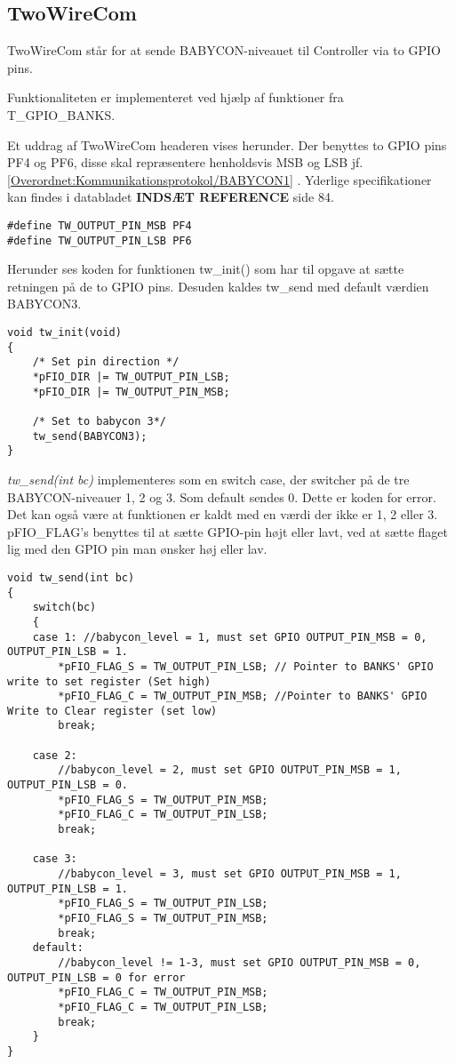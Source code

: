 \subsection{TwoWireCom}
TwoWireCom står for at sende BABYCON-niveauet til Controller via to GPIO pins. 

Funktionaliteten er implementeret ved hjælp af funktioner fra T\_GPIO\_BANKS. 

Et uddrag af TwoWireCom headeren vises herunder.
Der benyttes to GPIO pins PF4 og PF6, disse skal repræsentere henholdsvis MSB og LSB jf. \ref{Overordnet:Kommunikationsprotokol/BABYCON1} . Yderlige specifikationer kan findes i databladet \textbf{INDSÆT REFERENCE} side 84. 

\begin{verbatim}
#define TW_OUTPUT_PIN_MSB PF4
#define TW_OUTPUT_PIN_LSB PF6
\end{verbatim}

Herunder ses koden for funktionen tw\_init() som har til opgave at sætte retningen på de to GPIO pins. Desuden kaldes tw\_send med default værdien BABYCON3. 
\begin{verbatim}
void tw_init(void)
{
    /* Set pin direction */
    *pFIO_DIR |= TW_OUTPUT_PIN_LSB;
    *pFIO_DIR |= TW_OUTPUT_PIN_MSB;

    /* Set to babycon 3*/
    tw_send(BABYCON3);
}
\end{verbatim}

\textit{tw\_send(int bc)} implementeres som en switch case, der switcher på de tre BABYCON-niveauer 1, 2 og 3. Som default sendes 0. Dette er koden for error. Det kan også være at funktionen er kaldt med en værdi der ikke er 1, 2 eller 3.  
pFIO\_FLAG's benyttes til at sætte GPIO-pin højt eller lavt, ved at sætte flaget lig med den GPIO pin man ønsker høj eller lav. 

\begin{verbatim}
void tw_send(int bc)
{
    switch(bc)
    {
    case 1:	//babycon_level = 1, must set GPIO OUTPUT_PIN_MSB = 0, OUTPUT_PIN_LSB = 1.
        *pFIO_FLAG_S = TW_OUTPUT_PIN_LSB; // Pointer to BANKS' GPIO write to set register (Set high)
        *pFIO_FLAG_C = TW_OUTPUT_PIN_MSB; //Pointer to BANKS' GPIO Write to Clear register (set low)
        break;

    case 2:
        //babycon_level = 2, must set GPIO OUTPUT_PIN_MSB = 1, OUTPUT_PIN_LSB = 0.
        *pFIO_FLAG_S = TW_OUTPUT_PIN_MSB;
        *pFIO_FLAG_C = TW_OUTPUT_PIN_LSB;
        break;

    case 3:
        //babycon_level = 3, must set GPIO OUTPUT_PIN_MSB = 1, OUTPUT_PIN_LSB = 1.
        *pFIO_FLAG_S = TW_OUTPUT_PIN_LSB;
        *pFIO_FLAG_S = TW_OUTPUT_PIN_MSB;
        break;
    default:
        //babycon_level != 1-3, must set GPIO OUTPUT_PIN_MSB = 0, OUTPUT_PIN_LSB = 0 for error
        *pFIO_FLAG_C = TW_OUTPUT_PIN_MSB;
        *pFIO_FLAG_C = TW_OUTPUT_PIN_LSB;
        break;
    }
}
\end{verbatim}